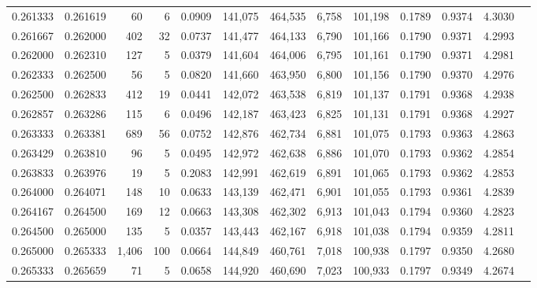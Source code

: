\begin{tabular}{rrrrrrrrrrrrr}
0.261333 & 0.261619 &    60 &   6 &                                     0.0909 & 141,075 & 464,535 &   6,758 & 101,198 & 0.1789 & 0.9374 & 4.3030 \\
0.261667 & 0.262000 &   402 &  32 &                                     0.0737 & 141,477 & 464,133 &   6,790 & 101,166 & 0.1790 & 0.9371 & 4.2993 \\
0.262000 & 0.262310 &   127 &   5 &                                     0.0379 & 141,604 & 464,006 &   6,795 & 101,161 & 0.1790 & 0.9371 & 4.2981 \\
0.262333 & 0.262500 &    56 &   5 &                                     0.0820 & 141,660 & 463,950 &   6,800 & 101,156 & 0.1790 & 0.9370 & 4.2976 \\
0.262500 & 0.262833 &   412 &  19 &                                     0.0441 & 142,072 & 463,538 &   6,819 & 101,137 & 0.1791 & 0.9368 & 4.2938 \\
0.262857 & 0.263286 &   115 &   6 &                                     0.0496 & 142,187 & 463,423 &   6,825 & 101,131 & 0.1791 & 0.9368 & 4.2927 \\
0.263333 & 0.263381 &   689 &  56 &                                     0.0752 & 142,876 & 462,734 &   6,881 & 101,075 & 0.1793 & 0.9363 & 4.2863 \\
0.263429 & 0.263810 &    96 &   5 &                                     0.0495 & 142,972 & 462,638 &   6,886 & 101,070 & 0.1793 & 0.9362 & 4.2854 \\
0.263833 & 0.263976 &    19 &   5 &                                     0.2083 & 142,991 & 462,619 &   6,891 & 101,065 & 0.1793 & 0.9362 & 4.2853 \\
0.264000 & 0.264071 &   148 &  10 &                                     0.0633 & 143,139 & 462,471 &   6,901 & 101,055 & 0.1793 & 0.9361 & 4.2839 \\
0.264167 & 0.264500 &   169 &  12 &                                     0.0663 & 143,308 & 462,302 &   6,913 & 101,043 & 0.1794 & 0.9360 & 4.2823 \\
0.264500 & 0.265000 &   135 &   5 &                                     0.0357 & 143,443 & 462,167 &   6,918 & 101,038 & 0.1794 & 0.9359 & 4.2811 \\
0.265000 & 0.265333 & 1,406 & 100 &                                     0.0664 & 144,849 & 460,761 &   7,018 & 100,938 & 0.1797 & 0.9350 & 4.2680 \\
0.265333 & 0.265659 &    71 &   5 &                                     0.0658 & 144,920 & 460,690 &   7,023 & 100,933 & 0.1797 & 0.9349 & 4.2674 \\

\end{tabular}
